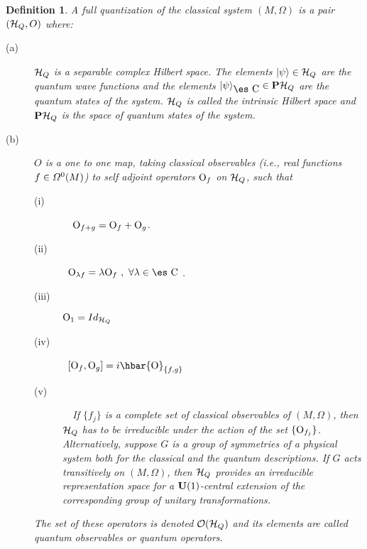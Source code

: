\documentclass[12pt]{article}
\theoremstyle{plain}
\newtheorem{definition}{Definition}
\def\H{{\cal H}}
\def\sta{|\psi \rangle }
\def\Op{{\rm O}}
\def\Complex{\mbox{\es C}}
\begin{document}
\begin{definition}
A {\rm full quantization} of the classical system $(M,\Omega )$
is a pair $(\H_Q,O)$ where:
\begin{description}
\item[{\rm (a)}]
$\H_Q$ is a separable complex Hilbert space.
The elements $\sta \in \H_Q$ are the {\rm quantum wave functions}
and the elements $\sta_{\Complex} \in {\bf P}\H_Q$
are the {\rm quantum states} of the system. $\H_Q$ is called the
{\rm intrinsic Hilbert space} and ${\bf P}\H_Q$ is the
{\rm space of quantum states} of the system.
\item[{\rm (b)}]
$O$ is a one to one map, taking classical observables
(i.e., real functions $f \in {\mit\Omega}^0(M)$) to self adjoint
operators
$\Op_f$ on $\H_Q$, such that
\begin{description}
\item[{\rm (i)}] \ \
$\Op_{f+g} =\Op_f+\Op_g$.
\item[{\rm (ii)}] \
$\Op_{\lambda f} = \lambda \Op_f \ , \
\forall \lambda \in \Complex$ .
\item[{\rm (iii)}]
$\Op_1 = Id_{\H_Q}$
\item[{\rm (iv)}] \
$[\Op_f,\Op_g] = i \hbar \Op_{\{ f,g \}}$
\item[{\rm (v)}] \ \
If $\{ f_j \}$ is a complete set of classical observables
of $(M,\Omega )$, then $\H_Q$ has to be irreducible
under the action of the set $\{ \Op_{f_j} \}$.
Alternatively, suppose $G$ is a group of symmetries of a physical system
both for the classical and the quantum descriptions.
If $G$ acts transitively on $(M, \Omega )$,
then $\H_Q$ provides an irreducible representation space
for a ${\bf U}(1)$-central extension of the corresponding
group of unitary transformations.
\end{description}
The set of these operators is denoted ${\cal O}(\H_Q)$
and its elements are called {\rm quantum observables} or {\rm quantum
operators}.
\end{description}
\label{fquan}
\end{definition}
\end{document}
